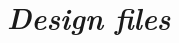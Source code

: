 \documentclass[11pt, letterpaper]{article}
\begin{document}


\newpage

\section*{\textit{Design files}}

\end{document}
